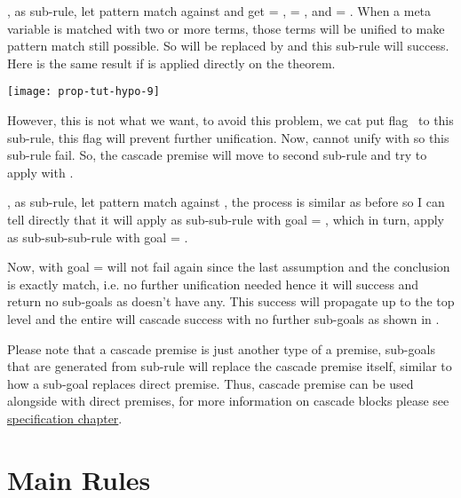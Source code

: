 \documentclass[master.tex]{subfiles}
\begin{document}
, as sub-rule, let  pattern match
against  and get  = ,
 = , and \pvar{$\Gamma$} = .
When a meta variable is matched with two or more terms, those terms will be
unified to make pattern match still possible. So  will be
replaced by  and this sub-rule will success. Here is the
same result if  is applied directly on the theorem.

\begin{center}
\texttt{[image: prop-tut-hypo-9]}
\end{center}

However, this is not what we want, to avoid this problem, we cat put flag
\kExactMatch\ to this sub-rule, this flag will prevent further unification. Now,
 cannot unify with  so this sub-rule
fail. So, the cascade premise will move to second sub-rule and try to apply
 with .

, as sub-rule, let  pattern match
against , the process is similar as before so I can tell
directly that it will apply  as sub-sub-rule with goal =
, which in turn, apply  as
sub-sub-sub-rule with goal = .

Now,  with goal =  will not fail
again since the last assumption and the conclusion is exactly match, i.e. no
further unification needed hence it will success and return no sub-goals as
 doesn't have any. This success will propagate up to the
top level and the entire will cascade success with no further sub-goals as shown
in .

Please note that a cascade premise is just another type of a premise, sub-goals
that are generated from sub-rule will replace the cascade premise itself,
similar to how a sub-goal replaces direct premise. Thus, cascade premise can be
used alongside with direct premises, for more information on cascade blocks
please see \hyperref[chap:specification]{specification chapter}.

\hspace{2ex}

\section{Main Rules}
\end{document}
